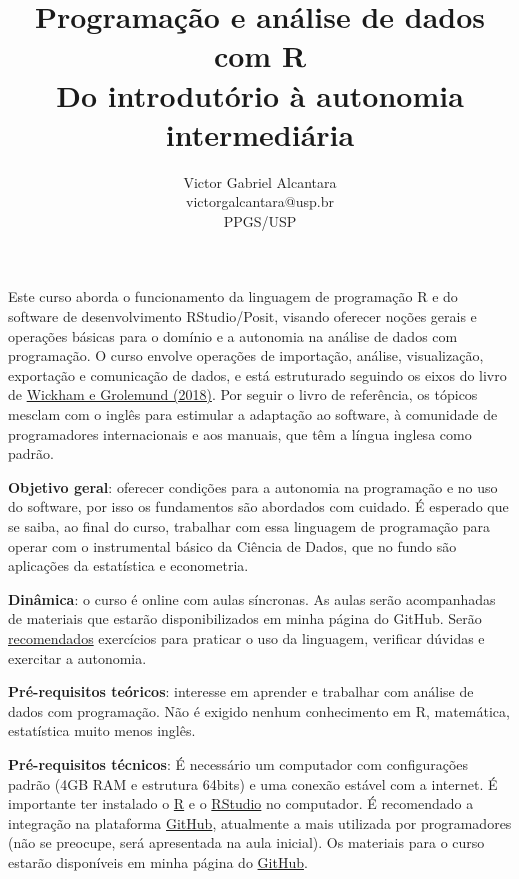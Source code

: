 \documentclass[a4paper,12pt]{article}
\title{\vspace{-3cm}Programação e análise de dados com R \\ \large Do introdutório à autonomia intermediária}
\author{Victor Gabriel Alcantara \\ victorgalcantara@usp.br \\ PPGS/USP}
\date{}
\begin{document}
\maketitle

Este curso aborda o funcionamento da linguagem de programação R e do software de desenvolvimento RStudio/Posit, visando oferecer noções gerais e operações básicas para o domínio e a autonomia na análise de dados com programação. O curso envolve operações de importação, análise, visualização, exportação e comunicação de dados, e está estruturado seguindo os eixos do livro de \href{https://r4ds.had.co.nz/}{Wickham e Grolemund (2018)}. Por seguir o livro de referência, os tópicos mesclam com o inglês para estimular a adaptação ao software, à comunidade de programadores internacionais e aos manuais, que têm a língua inglesa como padrão.

\vspace{1cm}

\textbf{Objetivo geral}: oferecer condições para a autonomia na programação e no uso do software, por isso os fundamentos são abordados com cuidado. É esperado que se saiba, ao final do curso, trabalhar com essa linguagem de programação para operar com o instrumental básico da Ciência de Dados, que no fundo são aplicações da estatística e econometria.

\vspace{0.5cm}

\textbf{Dinâmica}: o curso é online com aulas síncronas. As aulas serão acompanhadas de materiais que estarão disponibilizados em minha página do GitHub. Serão \underline{recomendados} exercícios para praticar o uso da linguagem, verificar dúvidas e exercitar a autonomia.

\vspace{0.5cm}

\textbf{Pré-requisitos teóricos}: interesse em aprender e trabalhar com análise de dados com programação. Não é exigido nenhum conhecimento em R, matemática, estatística muito menos inglês.

\vspace{0.5cm}

\textbf{Pré-requisitos técnicos}: É necessário um computador com configurações padrão (4GB RAM e estrutura 64bits) e uma conexão estável com a internet. É importante ter instalado o \href{https://brieger.esalq.usp.br/CRAN/}{R} e o \href{https://www.rstudio.com/products/rstudio/download}{RStudio} no computador. É recomendado a integração na plataforma \href{https://github.com/}{GitHub}, atualmente a mais utilizada por programadores (não se preocupe, será apresentada na aula inicial). Os materiais para o curso estarão disponíveis em minha página do \href{https://github.com/victorgalcantara?tab=repositories}{GitHub}.
\end{document}
